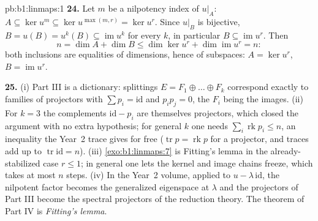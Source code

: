 \begin{solution}{pb:b1:linmaps:1}
\textbf{24.} Let $m$ be a nilpotency index of $u|_A$: $A
\subseteq \ker u^{m} \subseteq \ker u^{\max(m,r)} = \ker u^{r}$.
Since $u|_B$ is bijective, $B = u(B) = u^{k}(B) \subseteq
\operatorname{im} u^{k}$ for every $k$, in particular $B
\subseteq \operatorname{im} u^{r}$. Then
\[
n = \dim A + \dim B \leq \dim\ker u^{r} +
\dim\operatorname{im} u^{r} = n :
\]
both inclusions are equalities of dimensions, hence of
subspaces: $A = \ker u^{r}$, $B = \operatorname{im} u^{r}$.

\textbf{25.} (i) Part III is a dictionary: splittings $E = F_1
\oplus \dots \oplus F_k$ correspond exactly to families of
projectors with $\sum p_i = \mathrm{id}$ and $p_i p_j = 0$, the
$F_i$ being the images. (ii) For $k = 3$ the complements
$\mathrm{id} - p_i$ are themselves projectors, which closed the
argument with no extra hypothesis; for general $k$ one needs
$\sum_i \operatorname{rk} p_i \leq n$, an inequality the Year~2
trace gives for free ($\operatorname{tr} p = \operatorname{rk}
p$ for a projector, and traces add up to $\operatorname{tr}
\mathrm{id} = n$). (iii) \cref{exo:b1:linmaps:7} is Fitting's
lemma in the already-stabilized case $r \leq 1$; in general one
lets the kernel and image chains freeze, which takes at most $n$
steps. (iv) In the Year~2 volume, applied to $u - \lambda\,
\mathrm{id}$, the nilpotent factor becomes the generalized
eigenspace at $\lambda$ and the projectors of Part III become
the spectral projectors of the reduction theory. The theorem of
Part IV is \emph{Fitting's lemma}.
\end{solution}
